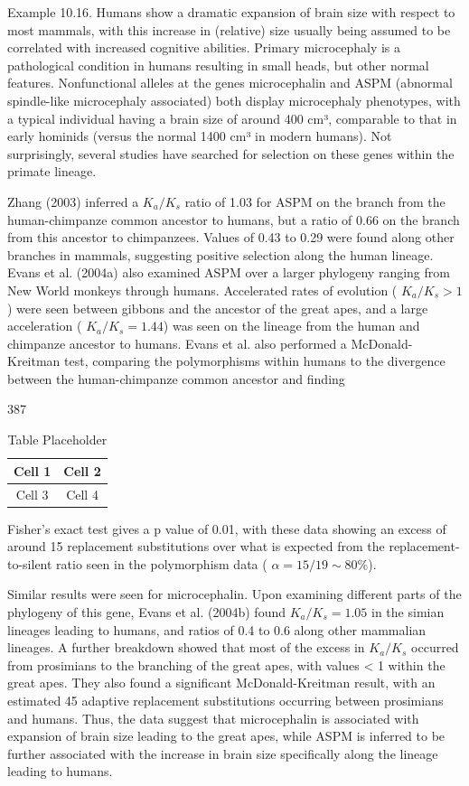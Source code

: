 \documentclass{article}
\begin{document}
Example 10.16. Humans show a dramatic expansion of brain size with respect to most mammals, with this increase in (relative) size usually being assumed to be correlated with increased cognitive abilities. Primary microcephaly is a pathological condition in humans resulting in small heads, but other normal features. Nonfunctional alleles at the genes microcephalin and ASPM (abnormal spindle-like microcephaly associated) both display microcephaly phenotypes, with a typical individual having a brain size of around 400 cm³, comparable to that in early hominids (versus the normal 1400 cm³ in modern humans). Not surprisingly, several studies have searched for selection on these genes within the primate lineage.

Zhang (2003) inferred a  $ K_a/K_s $ ratio of 1.03 for ASPM on the branch from the human-chimpanze common ancestor to humans, but a ratio of 0.66 on the branch from this ancestor to chimpanzees. Values of 0.43 to 0.29 were found along other branches in mammals, suggesting positive selection along the human lineage. Evans et al. (2004a) also examined ASPM over a larger phylogeny ranging from New World monkeys through humans. Accelerated rates of evolution ( $ K_a/K_s > 1 $) were seen between gibbons and the ancestor of the great apes, and a large acceleration ( $ K_a/K_s = 1.44 $) was seen on the lineage from the human and chimpanze ancestor to humans. Evans et al. also performed a McDonald-Kreitman test, comparing the polymorphisms within humans to the divergence between the human-chimpanze common ancestor and finding

387

\begin{table}[h]
\centering
\begin{tabular}{|c|c|}
\hline
Cell 1 & Cell 2 \\
\hline
Cell 3 & Cell 4 \\
\hline
\end{tabular}
\caption{Table Placeholder}
\end{table}

Fisher’s exact test gives a p value of 0.01, with these data showing an excess of around 15 replacement substitutions over what is expected from the replacement-to-silent ratio seen in the polymorphism data ( $ \alpha = 15/19 \sim 80\% $).

Similar results were seen for microcephalin. Upon examining different parts of the phylogeny of this gene, Evans et al. (2004b) found  $ K_a / K_s = 1.05 $ in the simian lineages leading to humans, and ratios of 0.4 to 0.6 along other mammalian lineages. A further breakdown showed that most of the excess in  $ K_a / K_s $ occurred from prosimians to the branching of the great apes, with values < 1 within the great apes. They also found a significant McDonald-Kreitman result, with an estimated 45 adaptive replacement substitutions occurring between prosimians and humans. Thus, the data suggest that microcephalin is associated with expansion of brain size leading to the great apes, while ASPM is inferred to be further associated with the increase in brain size specifically along the lineage leading to humans.
\end{document}
